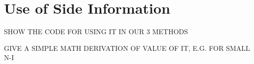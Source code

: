 \chapter{Use of Side Information}  
\label{chap:covars} 

SHOW THE CODE FOR USING IT IN OUR 3 METHODS

GIVE A SIMPLE MATH DERIVATION OF VALUE OF IT, E.G. FOR SMALL N-I

